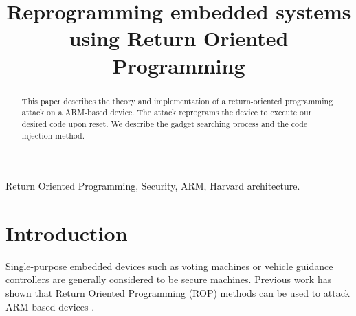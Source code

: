 
\usepackage{tikz}
\usepackage{verbatim}
\usepackage{listings}


\title{Reprogramming embedded systems using Return Oriented Programming}

\author{
}

\maketitle


\begin{abstract}
This paper describes the theory and implementation of a return-oriented programming attack on a ARM-based device. The attack reprograms the device to execute our desired code upon reset. We describe the gadget searching process and the code injection method. 


\end{abstract}

\begin{IEEEkeywords}
Return Oriented Programming, Security, ARM, Harvard architecture.
\end{IEEEkeywords}

\section{Introduction}
	Single-purpose embedded devices such as voting machines or vehicle guidance controllers are generally considered to be secure machines. Previous work has shown that Return Oriented Programming (ROP) methods can be used to attack ARM-based devices \cite{checkoway2009can} \cite{Kunz}. %

